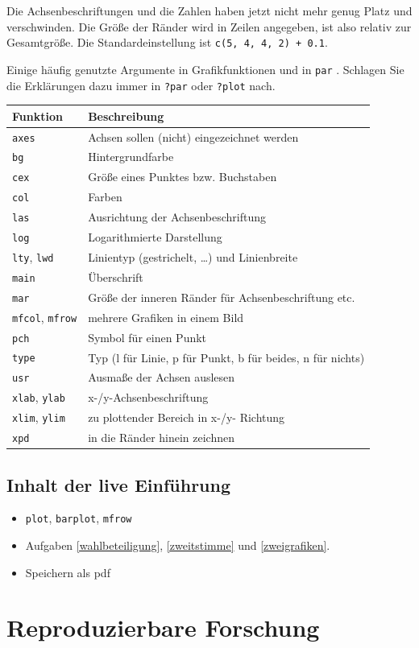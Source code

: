 \documentclass[]{book}
\providecommand{\tightlist}{%
  \setlength{\itemsep}{0pt}\setlength{\parskip}{0pt}}
\begin{document}
Die Achsenbeschriftungen und die Zahlen haben jetzt nicht mehr genug Platz und verschwinden. Die Größe der Ränder wird in Zeilen angegeben, ist also relativ zur Gesamtgröße. Die Standardeinstellung ist \texttt{c(5,\ 4,\ 4,\ 2)\ +\ 0.1}.

Einige häufig genutzte Argumente in Grafikfunktionen und in \texttt{par} \citep[nach][verändert]{Ligges2008}. Schlagen Sie die Erklärungen dazu immer in \texttt{?par} oder \texttt{?plot} nach.

\begin{longtable}[]{@{}ll@{}}
\toprule
Funktion & Beschreibung\tabularnewline
\midrule
\endhead
\texttt{axes} & Achsen sollen (nicht) eingezeichnet werden\tabularnewline
\texttt{bg} & Hintergrundfarbe\tabularnewline
\texttt{cex} & Größe eines Punktes bzw. Buchstaben\tabularnewline
\texttt{col} & Farben\tabularnewline
\texttt{las} & Ausrichtung der Achsenbeschriftung\tabularnewline
\texttt{log} & Logarithmierte Darstellung\tabularnewline
\texttt{lty}, \texttt{lwd} & Linientyp (gestrichelt, \ldots{}) und Linienbreite\tabularnewline
\texttt{main} & Überschrift\tabularnewline
\texttt{mar} & Größe der inneren Ränder für Achsenbeschriftung etc.\tabularnewline
\texttt{mfcol}, \texttt{mfrow} & mehrere Grafiken in einem Bild\tabularnewline
\texttt{pch} & Symbol für einen Punkt\tabularnewline
\texttt{type} & Typ (l für Linie, p für Punkt, b für beides, n für nichts)\tabularnewline
\texttt{usr} & Ausmaße der Achsen auslesen\tabularnewline
\texttt{xlab}, \texttt{ylab} & x-/y-Achsenbeschriftung\tabularnewline
\texttt{xlim}, \texttt{ylim} & zu plottender Bereich in x-/y- Richtung\tabularnewline
\texttt{xpd} & in die Ränder hinein zeichnen\tabularnewline
\bottomrule
\end{longtable}

\hypertarget{inhalt-der-live-einfuxfchrung-2}{%
\section{Inhalt der live Einführung}\label{inhalt-der-live-einfuxfchrung-2}}

\begin{itemize}
\tightlist
\item
  \texttt{plot}, \texttt{barplot}, \texttt{mfrow}
\item
  Aufgaben \ref{wahlbeteiligung}, \ref{zweitstimme} und \ref{zweigrafiken}.
\item
  Speichern als pdf
\end{itemize}

\hypertarget{reproduzieren}{%
\chapter{Reproduzierbare Forschung}\label{reproduzieren}}
\end{document}
